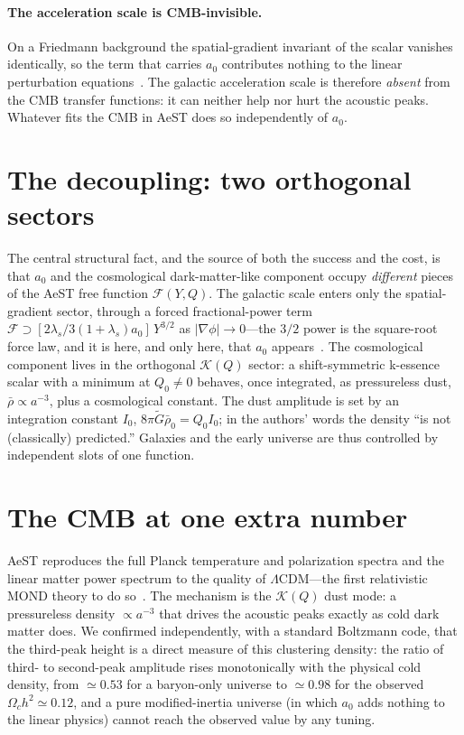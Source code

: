 \documentclass[aps,prd,twocolumn,10pt,nofootinbib,superscriptaddress]{revtex4-2}
\begin{document}
\paragraph{The acceleration scale is CMB-invisible.} On a Friedmann background the spatial-gradient invariant of the
scalar vanishes identically, so the term that carries $a_0$ contributes nothing to the linear perturbation
equations~\cite{Skordis2021}. The galactic acceleration scale is therefore \emph{absent} from the CMB transfer
functions: it can neither help nor hurt the acoustic peaks. Whatever fits the CMB in AeST does so independently of
$a_0$.

\section{The decoupling: two orthogonal sectors}
The central structural fact, and the source of both the success and the cost, is that $a_0$ and the cosmological
dark-matter-like component occupy \emph{different} pieces of the AeST free function $\mathcal{F}(Y,Q)$. The galactic
scale enters only the spatial-gradient sector, through a forced fractional-power term $\mathcal{F}\supset
[2\lambda_s/3(1{+}\lambda_s)a_0]\,Y^{3/2}$ as $|\nabla\phi|\to0$---the $3/2$ power is the square-root force law, and it
is here, and only here, that $a_0$ appears~\cite{Skordis2021}. The cosmological component lives in the orthogonal
$\mathcal{K}(Q)$ sector: a shift-symmetric k-essence scalar with a minimum at $Q_0\neq0$ behaves, once integrated, as
pressureless dust, $\bar\rho\propto a^{-3}$, plus a cosmological constant. The dust amplitude is set by an integration
constant $I_0$, $8\pi\tilde{G}\bar\rho_0=Q_0 I_0$; in the authors' words the density ``is not (classically)
predicted.'' Galaxies and the early universe are thus controlled by independent slots of one function.

\section{The CMB at one extra number}
AeST reproduces the full Planck temperature and polarization spectra and the linear matter power spectrum to the
quality of $\Lambda$CDM---the first relativistic MOND theory to do so~\cite{Skordis2021}. The mechanism is the
$\mathcal{K}(Q)$ dust mode: a pressureless density $\propto a^{-3}$ that drives the acoustic peaks exactly as cold
dark matter does. We confirmed independently, with a standard Boltzmann code, that the third-peak height is a direct
measure of this clustering density: the ratio of third- to second-peak amplitude rises monotonically with the
physical cold density, from $\simeq0.53$ for a baryon-only universe to $\simeq0.98$ for the observed
$\Omega_c h^2\simeq0.12$, and a pure modified-inertia universe (in which $a_0$ adds nothing to the linear physics)
cannot reach the observed value by any tuning.
\end{document}
